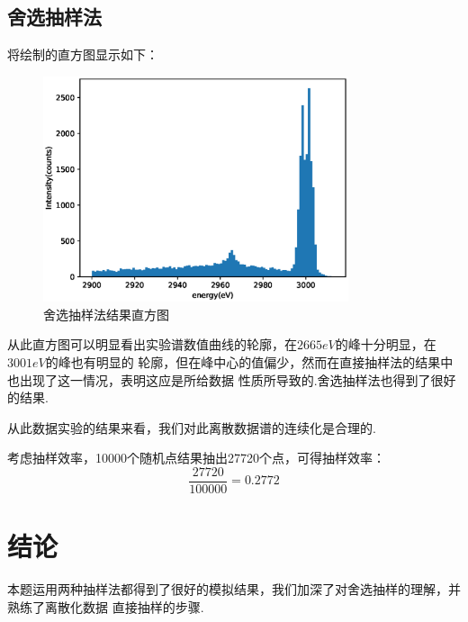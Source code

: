 \documentclass[12pt,a4paper,utf8]{ctexart}
\begin{document}
\subsection{舍选抽样法}
将绘制的直方图显示如下：
\begin{figure}[htpb]
    \centering
    \includegraphics[width=0.8\textwidth]{fig_1.eps}
    \caption{舍选抽样法结果直方图}
\end{figure}

从此直方图可以明显看出实验谱数值曲线的轮廓，在$2665eV$的峰十分明显，在$3001eV$的峰也有明显的
轮廓，但在峰中心的值偏少，然而在直接抽样法的结果中也出现了这一情况，表明这应是所给数据
性质所导致的.舍选抽样法也得到了很好的结果.

从此数据实验的结果来看，我们对此离散数据谱的连续化是合理的.

考虑抽样效率，10000个随机点结果抽出27720个点，可得抽样效率：
\begin{equation}
    \frac{27720}{100000} = 0.2772
\end{equation}
\section{结论}
本题运用两种抽样法都得到了很好的模拟结果，我们加深了对舍选抽样的理解，并熟练了离散化数据
直接抽样的步骤.
\end{document}
